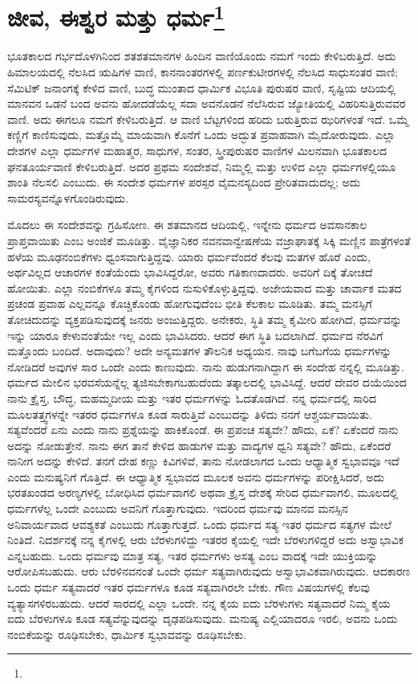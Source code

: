 
\chapter{ಜೀವ, ಈಶ್ವರ ಮತ್ತು ಧರ್ಮ\protect\footnote{}}

ಭೂತಕಾಲದ ಗರ್ಭದೊಳಗಿನಿಂದ ಶತಶತಮಾನಗಳ ಹಿಂದಿನ ವಾಣಿಯೊಂದು ನಮಗೆ ಇಂದು ಕೇಳಿಬರುತ್ತಿದೆ. ಅದು ಹಿಮಾಲಯದಲ್ಲಿ ನೆಲಸಿದ ಋಷಿಗಳ ವಾಣಿ, ಕಾನನಾಂತರಗಳಲ್ಲಿ ಪರ್ಣಕುಟೀರಗಳಲ್ಲಿ ನೆಲಸಿದ ಸಾಧುಸಂತರ ವಾಣಿ; ಸೆಮಿಟಿಕ್ ಜನಾಂಗಕ್ಕೆ ಕೇಳಿದ ವಾಣಿ, ಬುದ್ಧ ಮುಂತಾದ ಧಾರ್ಮಿಕ ವಿಭೂತಿ ಪುರುಷರ ವಾಣಿ, ಸೃಷ್ಟಿಯ ಆದಿಯಲ್ಲಿ ಮಾನವನ ಒಡನೆ ಬಂದ ಅವನು ಹೋದಡೆಯೆಲ್ಲ ಸದಾ ಅವನೊಡನೆ ನೆಲೆಸಿರುವ ಜ್ಯೋತಿಯಲ್ಲಿ ವಿಹರಿಸುತ್ತಿರುವವರ ವಾಣಿ. ಅದು ಈಗಲೂ ನಮಗೆ ಕೇಳಿಬರುತ್ತಿದೆ. ಆ ವಾಣಿ ಬೆಟ್ಟಗಳಿಂದ ಹರಿದು ಬರುತ್ತಿರುವ ಝರಿಗಳಂತೆ ಇದೆ. ಒಮ್ಮೆ ಕಣ್ಣಿಗೆ ಕಾಣಿಸುವುದು, ಮತ್ತೊಮ್ಮೆ ಮಾಯವಾಗಿ ಕೊನೆಗೆ ಒಂದು ಅದ್ಭುತ ಪ್ರವಾಹವಾಗಿ ಮೈದೋರುವುದು. ಎಲ್ಲಾ ದೇಶಗಳ ಎಲ್ಲಾ ಧರ್ಮಗಳ ಮಹಾತ್ಮರ, ಸಾಧುಗಳ, ಸಂತರ, ಸ್ತ್ರೀಪುರುಷರ ವಾಣಿಗಳ ಮಿಲನವಾಗಿ ಭೂತಕಾಲದ ಘನತೂರ್ಯವಾಣಿ ಕೇಳಿಬರುತ್ತಿದೆ. ಅದರ ಪ್ರಥಮ ಸಂದೇಶವೆ, ನಿಮ್ಮಲ್ಲಿ ಮತ್ತು ಉಳಿದ ಎಲ್ಲಾ ಧರ್ಮಗಳಲ್ಲಿಯೂ ಶಾಂತಿ ನೆಲಸಲಿ ಎಂಬುದು. ಈ ಸಂದೇಶ ಧರ್ಮಗಳ ಪರಸ್ಪರ ವೈಮನಸ್ಯದಿಂದ ಪ್ರೇರಿತವಾದುದಲ್ಲ; ಅದು ಸಾಮರಸ್ಯವನ್ನೊಳಗೊಂಡಿರುವುದು.

ಮೊದಲು ಈ ಸಂದೇಶವನ್ನು ಗ್ರಹಿಸೋಣ. ಈ ಶತಮಾನದ ಆದಿಯಲ್ಲಿ, ಇನ್ನೇನು ಧರ್ಮದ ಅವಸಾನಕಾಲ ಪ್ರಾಪ್ತವಾಯಿತು ಎಂಬ ಅಂಜಿಕೆ ಮೂಡಿತ್ತು. ವೈಜ್ಞಾನಿಕರ ನವನವಾನ್ವೇಷಣೆಯ ವಜ್ರಾಘಾತಕ್ಕೆ ಸಿಕ್ಕಿ ಮಣ್ಣಿನ ಪಾತ್ರೆಗಳಂತೆ ಹಳೆಯ ಮೂಢನಂಬಿಕೆಗಳು ಧ್ವಂಸವಾಗುತ್ತಿದ್ದವು. ಯಾರು ಧರ್ಮವೆಂದರೆ ಕೆಲವು ಮತಗಳ ಹೊರೆ ಎಂದು, ಅರ್ಥವಿಲ್ಲದ ಆಚಾರಗಳ ಕಂತೆಯೆಂದು ಭಾವಿಸಿದ್ದರೋ, ಅವರು ಗತಿಕಾಣದಾದರು. ಅವರಿಗೆ ದಿಕ್ಕೆ ತೋಚದೆ ಹೋಯಿತು. ಎಲ್ಲಾ ನಂಬಿಕೆಗಳೂ ತಮ್ಮ ಕೈಗಳಿಂದ ನುಸುಳಿಕೊಳ್ಳುತ್ತಿದ್ದವು. ಅಜೇಯವಾದ ಮತ್ತು ಚಾರ್ವಾಕ ಮತದ ಪ್ರಚಂಡ ಪ್ರವಾಹ ಎಲ್ಲವನ್ನೂ ಕೊಚ್ಚಿಕೊಂಡು ಹೋಗುವುದೆಂಬ ಭೀತಿ ಕೆಲಕಾಲ ಮೂಡಿತು. ತಮ್ಮ ಮನಸ್ಸಿಗೆ ತೋಚಿದುದನ್ನು ವ್ಯಕ್ತಪಡಿಸುವುದಕ್ಕೆ ಜನರು ಅಂಜುತ್ತಿದ್ದರು. ಅನೇಕರು, ಸ್ಥಿತಿ ತಮ್ಮ ಕೈಮೀರಿ ಹೋಗಿದೆ, ಧರ್ಮವನ್ನು ಇನ್ನು ಯಾರೂ ಕೇಳುವಂತೆಯೇ ಇಲ್ಲ ಎಂದು ಭಾವಿಸಿದರು. ಆದರೆ ಈಗ ಸ್ಥಿತಿ ಬದಲಾಗಿದೆ. ಧರ್ಮದ ನೆರವಿಗೆ ಮತ್ತೊಂದು ಬಂದಿದೆ. ಅದಾವುದು? ಅದೇ ಅನ್ಯಮತಗಳ ತೌಲನಿಕ ಅಧ್ಯಯನ. ನಾವು ಬಗೆಬಗೆಯ ಧರ್ಮಗಳನ್ನು ನೋಡಿದರೆ ಅವುಗಳ ಸಾರ ಒಂದೇ ಎಂದು ಕಾಣುವುದು. ನಾನು ಹುಡುಗನಾಗಿದ್ದಾಗ ಈ ಸಂದೇಹ ನನ್ನಲ್ಲಿ ಮೂಡಿತ್ತು. ಧರ್ಮದ ಮೇಲಿನ ಭರವಸೆಯನ್ನೆಲ್ಲ ತ್ಯಜಿಸಬೇಕಾಗಬಹುದೆಂದು ತತ್ಕಾಲದಲ್ಲಿ ಭಾವಿಸಿದ್ದೆ. ಆದರೆ ದೇವರ ದಯೆಯಿಂದ ನಾನು ಕ್ರೈಸ್ತ, ಬೌದ್ಧ, ಮಹಮ್ಮದೀಯ ಮತ್ತು ಇತರ ಧರ್ಮಗಳನ್ನು ಓದತೊಡಗಿದೆ. ನನ್ನ ಧರ್ಮದಲ್ಲಿ ಸಾರಿದ ಮೂಲತತ್ತ್ವಗಳನ್ನೇ ಇತರರ ಧರ್ಮಗಳೂ ಕೂಡ ಸಾರುತ್ತಿವೆ ಎಂಬುದನ್ನು ತಿಳಿದು ನನಗೆ ಆಶ್ಚರ್ಯವಾಯಿತು. ಸತ್ಯವೆಂದರೆ ಏನು ಎಂದು ನಾನು ಪ್ರಶ್ನೆಯನ್ನು ಹಾಕಿಕೊಂಡೆ. ಈ ಪ್ರಪಂಚ ಸತ್ಯವೇ? ಹೌದು, ಏಕೆ? ಏಕೆಂದರೆ ನಾನು ಅದನ್ನು ನೋಡುತ್ತೇನೆ. ನಾನು ಈಗ ತಾನೆ ಕೇಳಿದ ಹಾಡುಗಳ ಮತ್ತು ವಾದ್ಯಗಳ ಧ್ವನಿ ಸತ್ಯವೇ? ಹೌದು, ಏಕೆಂದರೆ ನಾನೀಗ ಅದನ್ನು ಕೇಳಿದೆ. ತನಗೆ ದೇಹ ಕಣ್ಣು ಕಿವಿಗಳಿವೆ, ತಾನು ನೋಡಲಾಗದ ಒಂದು ಆಧ್ಯಾತ್ಮಿಕ ಸ್ವಭಾವವೂ ಇದೆ ಎಂದು ಮನುಷ್ಯನಿಗೆ ಗೊತ್ತಿದೆ. ಈ ಆಧ್ಯಾತ್ಮಿಕ ಸ್ವಭಾವದ ಮೂಲಕ ಅವನು ಧರ್ಮಗಳನ್ನು ಪರೀಕ್ಷಿಸಿದರೆ, ಅದು ಭರತಖಂಡದ ಅರಣ್ಯಗಳಲ್ಲಿ ಬೋಧಿಸಿದ ಧರ್ಮವಾಗಲಿ ಅಥವಾ ಕ್ರೈಸ್ತ ದೇಶಕ್ಕೆ ಸೇರಿದ ಧರ್ಮವಾಗಲಿ, ಮೂಲದಲ್ಲಿ ಧರ್ಮಗಳೆಲ್ಲ ಒಂದೇ ಎಂಬುದು ಅವನಿಗೆ ಗೊತ್ತಾಗುವುದು. ಇದರಿಂದ ಧರ್ಮವು ಮಾನವ ಮನಸ್ಸಿನ ಅನಿವಾರ್ಯವಾದ ಆವಶ್ಯಕತೆ ಎಂಬುದು ಗೊತ್ತಾಗುತ್ತದೆ. ಒಂದು ಧರ್ಮದ ಸತ್ಯ ಇತರ ಧರ್ಮದ ಸತ್ಯಗಳ ಮೇಲೆ ನಿಂತಿದೆ. ನಿದರ್ಶನಕ್ಕೆ ನನ್ನ ಕೈಗಳಲ್ಲಿ ಆರು ಬೆರಳುಗಳಿದ್ದು ಇತರರ ಕೈಯಲ್ಲಿ ಇದೇ ಬೆರಳುಗಳಿದ್ದರೆ ಅದು ಅಸ್ವಾಭಾವಿಕ ಎನ್ನಬಹುದು. ಒಂದು ಧರ್ಮವು ಮಾತ್ರ ಸತ್ಯ, ಇತರ ಧರ್ಮಗಳು ಅಸತ್ಯ ಎಂಬ ವಾದಕ್ಕೆ ಇದೇ ಯುಕ್ತಿಯನ್ನು ಆರೋಪಿಸಬಹುದು. ಆರು ಬೆರಳಿನವನಂತೆ ಒಂದೇ ಧರ್ಮ ಸತ್ಯವಾಗಿರುವುದು ಅಸ್ವಾಭಾವಿಕವಾಗಿರುವುದು. ಆದಕಾರಣ ಒಂದು ಧರ್ಮ ಸತ್ಯವಾದರೆ ಇತರ ಧರ್ಮಗಳೂ ಕೂಡ ಸತ್ಯವಾಗಿರಲೇ ಬೇಕು. ಗೌಣ ವಿಷಯಗಳಲ್ಲಿ ಕೆಲವು ವ್ಯತ್ಯಾಸಗಳಿರಬಹುದು. ಆದರೆ ಸಾರದಲ್ಲಿ ಎಲ್ಲಾ ಒಂದೇ. ನನ್ನ ಕೈಯ ಐದು ಬೆರಳುಗಳು ಸತ್ಯವಾದರೆ ನಿಮ್ಮ ಕೈಯ ಐದು ಬೆರಳುಗಳೂ ಕೂಡ ಸತ್ಯವೆನ್ನುವುದನ್ನು ದೃಢಪಡಿಸುವುದು. ಮನುಷ್ಯ ಎಲ್ಲಿಯಾದರೂ ಇರಲಿ, ಅವನು ಒಂದು ನಂಬಿಕೆಯನ್ನು ರೂಢಿಸಬೇಕು, ಧಾರ್ಮಿಕ ಸ್ವಭಾವವನ್ನು ರೂಢಿಸಬೇಕು.


